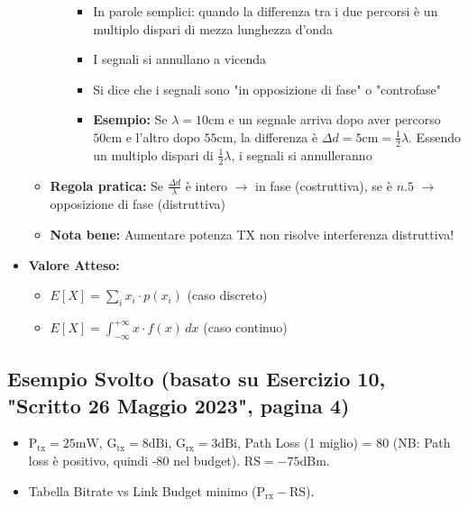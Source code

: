\begin{itemize}
\begin{itemize}
\begin{itemize}
            \begin{itemize}
                \item In parole semplici: quando la differenza tra i due percorsi è un multiplo dispari di mezza lunghezza d'onda
                \item I segnali si annullano a vicenda
                \item Si dice che i segnali sono "in opposizione di fase" o "controfase"
                \item \textbf{Esempio:} Se $\lambda = 10\text{cm}$ e un segnale arriva dopo aver percorso $50\text{cm}$ e l'altro dopo $55\text{cm}$, la differenza è $\Delta d = 5\text{cm} = \frac{1}{2}\lambda$. Essendo un multiplo dispari di $\frac{1}{2}\lambda$, i segnali si annulleranno
            \end{itemize}
        \end{itemize}
        \item \textbf{Regola pratica:} Se $\frac{\Delta d}{\lambda}$ è intero $\to$ in fase (costruttiva), se è $n.5$ $\to$ opposizione di fase (distruttiva)
        \item \textbf{Nota bene:} Aumentare potenza TX non risolve interferenza distruttiva!
    \end{itemize}
    \item \textbf{Valore Atteso:}
    \begin{itemize}
        \item $E[X] = \sum_{i} x_i \cdot p(x_i)$ (caso discreto)
        \item $E[X] = \int_{-\infty}^{+\infty} x \cdot f(x) \, dx$ (caso continuo)
    \end{itemize}
\end{itemize}

\subsection{Esempio Svolto (basato su Esercizio 10, "Scritto 26 Maggio 2023", pagina 4)}
\begin{itemize}
    \item $\text{P}_{\text{tx}} = 25\text{mW}$, $\text{G}_{\text{tx}} = 8\text{dBi}$, $\text{G}_{\text{rx}} = 3\text{dBi}$, Path Loss (1 miglio) = 80 (NB: Path loss è positivo, quindi -80 nel budget). $\text{RS} = -75\text{dBm}$.
    \item Tabella Bitrate vs Link Budget minimo ($\text{P}_{\text{rx}} - \text{RS}$).
\end{itemize}

